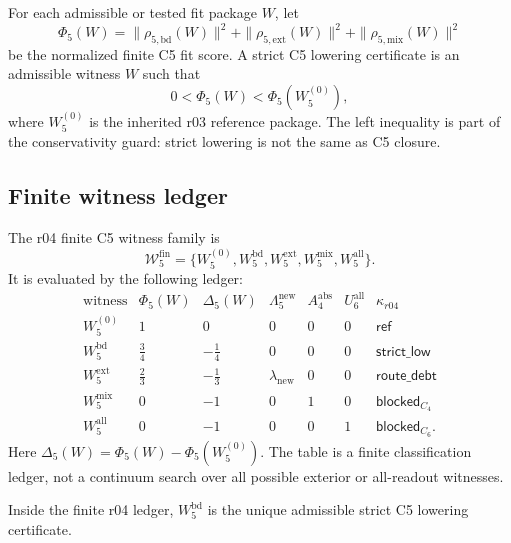 \begin{definition}
\label{def:v470-r04-c5-lowering-score}
For each admissible or tested fit package \(W\), let
\[
\Phi_5(W)
=
\|\rho_{5,\mathrm{bd}}(W)\|^2
+
\|\rho_{5,\mathrm{ext}}(W)\|^2
+
\|\rho_{5,\mathrm{mix}}(W)\|^2
\]
be the normalized finite C5 fit score.  A strict C5 lowering certificate is an
admissible witness \(W\) such that
\[
0 < \Phi_5(W) < \Phi_5(W_5^{(0)}),
\]
where \(W_5^{(0)}\) is the inherited r03 reference package.  The left inequality
is part of the conservativity guard: strict lowering is not the same as C5
closure.
\end{definition}

\subsection{Finite witness ledger}
\label{subsec:v470-r04-finite-witness-ledger}

\begin{definition}
\label{def:v470-r04-finite-c5-witness-ledger}
The r04 finite C5 witness family is
\[
\mathcal W_{5}^{\mathrm{fin}}
=
\{W_5^{(0)},W_5^{\mathrm{bd}},W_5^{\mathrm{ext}},W_5^{\mathrm{mix}},
W_5^{\mathrm{all}}\}.
\]
It is evaluated by the following ledger:
\[
\begin{array}{c|c|c|c|c|c|c}
\text{witness} & \Phi_5(W) & \Delta_5(W) &
\Lambda_5^{\mathrm{new}} & A_4^{\mathrm{abs}} & U_6^{\mathrm{all}} &
\kappa_{r04} \\
\hline
W_5^{(0)} & 1 & 0 & 0 & 0 & 0 & \mathsf{ref} \\
W_5^{\mathrm{bd}} & \tfrac34 & -\tfrac14 & 0 & 0 & 0 &
\mathsf{strict\_low} \\
W_5^{\mathrm{ext}} & \tfrac23 & -\tfrac13 & \lambda_{\mathrm{new}} & 0 & 0 &
\mathsf{route\_debt} \\
W_5^{\mathrm{mix}} & 0 & -1 & 0 & 1 & 0 &
\mathsf{blocked}_{C_4} \\
W_5^{\mathrm{all}} & 0 & -1 & 0 & 0 & 1 &
\mathsf{blocked}_{C_6}.
\end{array}
\]
Here \(\Delta_5(W)=\Phi_5(W)-\Phi_5(W_5^{(0)})\).  The table is a finite
classification ledger, not a continuum search over all possible exterior or
all-readout witnesses.
\end{definition}

\begin{lemma}
\label{lem:v470-r04-unique-admissible-strict-lowering}
Inside the finite r04 ledger, \(W_5^{\mathrm{bd}}\) is the unique admissible
strict C5 lowering certificate.
\end{lemma}

